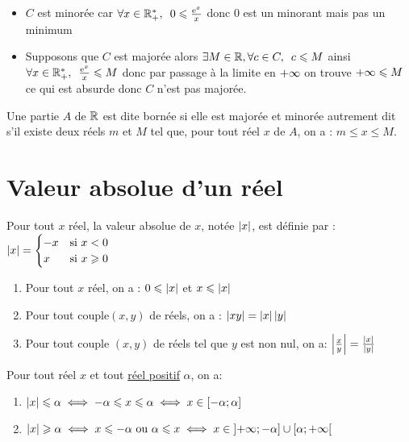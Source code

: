 \begin{corr}
	\begin{itemize}

		\item \(C\) est minorée car \( \quantifs{\forall x \in \Rps} 0 \leq \frac{\e{x}}{x} \) donc \(0\) est un minorant mais pas un minimum  \\
		\item Supposons que \(C\) est majorée alors \(\quantifs{\exists M \in \R,\forall c \in C} c\leq M \) ainsi \(\quantifs{\forall x \in \Rps} \frac{\e{x}}{x} \leq M \) donc par passage à la limite en \(+\infty\) on trouve \(+\infty \leqslant M\) ce qui est absurde donc \(C\) n'est pas majorée.
	\end{itemize}
\end{corr}

\begin{defi}
	Une partie \(A\) de \(\mathbb{R}\) est dite bornée si elle est majorée et minorée autrement dit s’il existe deux réels \(m\) et \(M\) tel que, pour tout réel \(x\) de \(A\), on a : \(m\leq x \leq M\).
\end{defi}

\section{Valeur absolue d'un réel}
\begin{defi}
Pour tout \(x\) réel, la valeur absolue de \(x\), notée \(\left\lvert x\right\rvert\), est définie par : \(\left\lvert x\right\rvert = \begin{cases}
	-x & \text{si }  x < 0   \\
	x  & \text{si }  x\geqslant 0 \\
\end{cases}\)
\end{defi}

\begin{prop}
	\begin{enumerate}
		\item Pour tout \(x\) réel, on a : \(0\leqslant\left\lvert x\right\rvert\) et \(x\leqslant\left\lvert x\right\rvert\)
		\item Pour tout couple\((x,y)\) de réels, on a : \(\left\lvert xy\right\rvert = \left\lvert x\right\rvert\left\lvert y\right\rvert\)
		\item Pour tout couple \((x,y)\) de réels tel que \(y\) est non nul, on a: \(\left\lvert\frac{x}{y}\right\rvert = \frac{\left\lvert x\right\rvert}{\left\lvert y\right\rvert}\)
	\end{enumerate}
\end{prop}

\begin{defprop}
	Pour tout réel \(x\) et tout \underline{réel positif} \(\alpha\), on a:
	\begin{enumerate}
		\item \(\left\lvert x\right\rvert\leqslant \alpha \iff -\alpha \leqslant x \leqslant \alpha \iff x \in \left[-\alpha;\alpha\right]\)
		\item \(\left\lvert x\right\rvert\geqslant \alpha \iff x \leqslant -\alpha\text{ ou } \alpha \leqslant x \iff x \in \left]+\infty;-\alpha\right]\cup\left[\alpha;+\infty\right[\)
	\end{enumerate}
\end{defprop}

